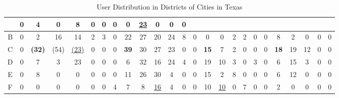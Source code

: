 \begin{table*}
\begin{tabular}{|c|c|c|c|c|c|c|c|c|c|c|c|c|c|c|c|c|c|c|c|c|c|c|c|c|}
& 0& 4& 0& 8& 0& 0
& 0& 0& \underline{23}& 0& 0& 0 \\
\hline
B
& 0& 2& 16& 14& 2& 3 
& 0& 22& 27& 20& 24& 8
& 0& 0& 0& 2& 2& 0
& 0& 8& 2& 0& 0& 0 \\
\hline
C
& 0& \textbf{(32)}& (54)& \underline{(23)}& 0& 0 
& 0& \textbf{39}& 30& 27& 23& 0
& 0& \textbf{15}& 7& 2& 0& 0 
& 0& \textbf{18}& 19& 12& 0& 0 \\
\hline
D
& 0& 7& 3& 23& 0& 0
& 0& 6& 32& 16& 24& 4
& 0& 19& 10& 3& 0& 3 
& 0& 6& 15& 3& 0& 0 \\
\hline
E
& 0& 8& 0& 0& 0& 0
& 0& 11& 26& 30& 4& 0 
& 0& 15& 2& 8& 0& 0
& 0& 6& 12& 0& 0& 0 \\
\hline
F
& 0& 0& 0& 0& 0& 0 
& 4& 7& 8& \underline{16}& 4& 0
& 0& 10& \underline{10}& 0& 7& 0
& 0& 2& 0& 0& 0& 0 \\
\hline
\end{tabular}	
\vspace*{0.1in} \\	
\label{table:cluster}	
\caption{User Distribution in Districts of Cities in Texas}	
\vspace{-0.4in}
\end{table*}	
